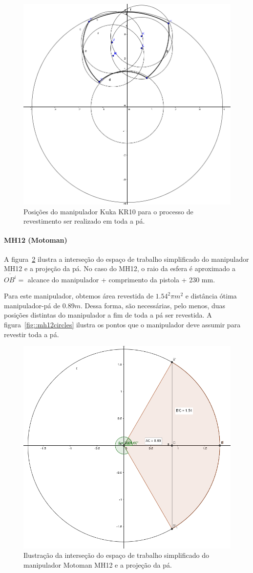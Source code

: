 \begin{figure}[h!]	
	\centering
	\includegraphics[width=0.6\columnwidth]{detail/figs/bighatch/kukacircles.png}
	\caption{Posições do manipulador Kuka KR10 para o processo de
	revestimento ser realizado em toda a pá.}
	\label{fig::kukacircles}
\end{figure}

\paragraph{MH12 (Motoman)}
A figura~\ref{fig::mh12geom} ilustra a interseção do espaço de trabalho
simplificado do manipulador MH12 e a projeção da pá. No
caso do MH12, o raio da esfera é aproximado a $\overline{OB^i} = $
alcance do manipulador + comprimento da pistola + 230 mm. 

Para este manipulador, obtemos área revestida de $1.54^2\pi m^2$ e distância
ótima manipulador-pá de $0.89 m$. Dessa forma, são necessárias, pelo menos,
duas posições distintas do manipulador a fim de toda a pá ser revestida. A
figura~\ref{fig::mh12circles} ilustra os pontos que o manipulador deve assumir
para revestir toda a pá.		

\begin{figure}[h!]	
	\centering
	\includegraphics[width=0.6\columnwidth]{detail/figs/bighatch/mh12geom.jpg}
	\caption{Ilustração da interseção do espaço de trabalho simplificado do
	manipulador Motoman MH12 e a projeção da pá.}
	\label{fig::mh12geom}
\end{figure}

